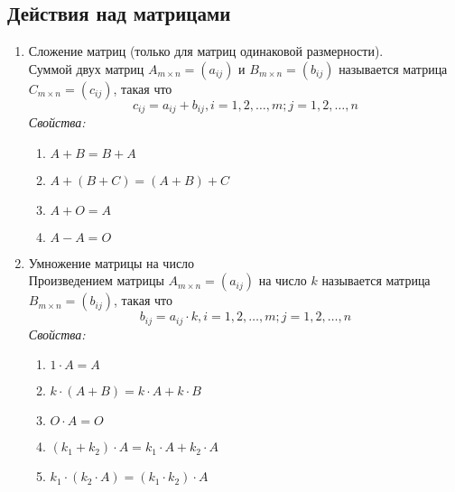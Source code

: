 \documentclass[12pt, fleqn]{article}
\begin{document}
\subsection*{Действия над матрицами}
\begin{enumerate}
	\item Сложение матриц (только для матриц одинаковой размерности).\\
	Суммой двух матриц $A_{m\times n}=\left(a_{ij}\right)$ и $ B_{m\times n}=\left(b_{ij}\right)$ называется матрица $C_{m\times n}=\left(c_{ij}\right)$, такая что
	$$c_{ij} = a_{ij} + b_{ij}, i=1,2,\dots ,m; j=1,2,\dots ,n$$
	\textit{Свойства:}
	\begin{enumerate}[1)]
		\item $A+B =B+A$
		\item $A+\left(B+C\right)=\left(A+B\right)+C$
		\item $A+O=A$
		\item $A-A=O$
	\end{enumerate}
	\item Умножение матрицы на число \\
	Произведением матрицы $A_{m\times n}=\left(a_{ij}\right)$ на число $k$ называется матрица $ B_{m\times n}=\left(b_{ij}\right)$, такая что
	$$b_{ij} = a_{ij} \cdot k, i=1,2,\dots,m; j=1,2,\dots ,n$$
	\textit{Свойства:}
	\begin{enumerate}[1)]
		\item $1\cdot A =A$
		\item $k\cdot\left(A + B\right)= k\cdot A + k\cdot B$
		\item $O\cdot A=O$
		\item $\left(k_1+k_2\right)\cdot A = k_1\cdot A + k_2\cdot A$
		\item $k_1\cdot\left(k_2\cdot A\right)=\left(k_1\cdot k_2\right)\cdot A$
	\end{enumerate}
\end{enumerate}
\end{document}
